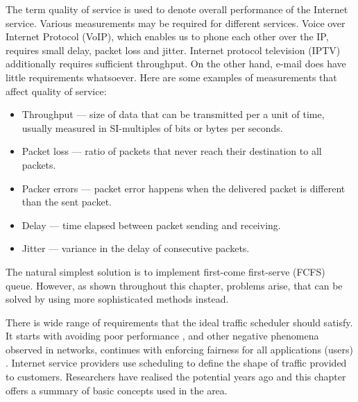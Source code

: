 The term quality of service is used to denote overall performance of the Internet service. Various measurements may be required for different services. Voice over Internet Protocol (VoIP), which enables us to phone each other over the IP, requires small delay, packet loss and jitter. Internet protocol television (IPTV) additionally requires sufficient throughput. On the other hand, e-mail does have little requirements whatsoever. Here are some examples of measurements that affect quality of service:
\begin{itemize}
	\item Throughput --- size of data that can be transmitted per a unit of time, usually measured in SI-multiples of bits or bytes per seconds.
	\item Packet loss --- ratio of packets\XX{,} that never reach their destination to all packets.
	\item Packer errors --- packet error happens\XX{,} when the delivered packet is different than the sent packet.
	\item Delay --- time elapsed between packet sending and receiving.
	\item Jitter --- variance in the delay of consecutive packets.
\end{itemize}

The natural simplest solution is to implement first-come first-serve (FCFS) queue. However, as shown throughout this chapter, problems arise, that can be solved by using more sophisticated methods instead.

There is wide range of requirements that the ideal traffic scheduler should satisfy. It starts with avoiding poor performance , and other negative phenomena observed in networks, continues with enforcing fairness for all applications (users) . Internet service providers use scheduling to define the shape of traffic provided to customers. Researchers have realised the potential  years ago and this chapter offers a summary of basic concepts used in the area.




